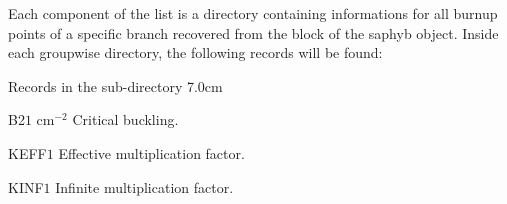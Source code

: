 Each component of the list  is a directory containing informations for all  burnup points of a specific branch recovered from the  block of the saphyb object. Inside each groupwise directory, the following records will be found:

  \begin{DescriptionEnregistrement}{Records 
 in the sub-directory  }{7.0cm} \label{tabl:tabDI}
 
 \RealEnr
 {B2}{$1$} { cm$^{-2}$} 
 {Critical buckling. }
 
 \RealEnr
 {KEFF}{$1$} { } 
 {Effective multiplication factor. }
 
 \RealEnr
 {KINF}{$1$} { } 
 {Infinite multiplication factor. }
 
 \end{DescriptionEnregistrement} 
\clearpage
